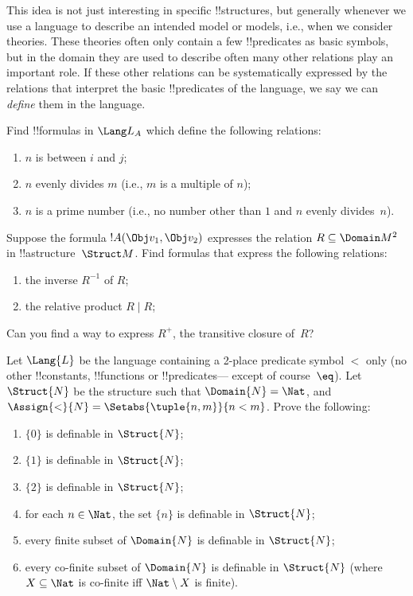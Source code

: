 \documentclass[../../../include/open-logic-section]{subfiles}
\begin{document}
\begin{explain}
This idea is not just interesting in specific !!{structure}s, but
generally whenever we use a language to describe an intended model or
models, i.e., when we consider theories.  These theories often only
contain a few !!{predicate}s as basic symbols, but in the domain they
are used to describe often many other relations play an important
role.  If these other relations can be systematically expressed by the
relations that interpret the basic !!{predicate}s of the language, we
say we can \emph{define} them in the language.
\end{explain}

\begin{prob}
Find !!{formula}s in $\Lang L_A$ which define the following relations:
\begin{enumerate}
\item $n$ is between $i$ and $j$;
\item $n$ evenly divides $m$ (i.e., $m$ is a multiple of $n$);
\item $n$ is a prime number (i.e., no number other than $1$ and $n$ evenly
  divides~$n$).
\end{enumerate}
\end{prob}

\begin{prob}
Suppose the formula $!A(\Obj v_1, \Obj v_2)$ expresses the relation $R
\subseteq \Domain M^2$ in !!a{structure}~$\Struct M$.  Find formulas
that express the following relations:
\begin{enumerate}
\item the inverse $R^{-1}$ of $R$;
\item the relative product $R \mid R$;
\end{enumerate}
Can you find a way to express $R^+$, the transitive closure of~$R$?
\end{prob}

\begin{prob}
Let $\Lang{L}$ be the language containing a 2-place predicate symbol
$<$ only (no other !!{constant}s, !!{function}s or !!{predicate}s---
except of course~$\eq$). Let $\Struct{N}$ be the structure such that
$\Domain{N} = \Nat$, and $\Assign{<}{N} = \Setabs{\tuple{n,m}}{n <
  m}$. Prove the following:
\begin{enumerate}
\item $\{ 0 \}$ is definable in $\Struct{N}$;
\item $\{ 1 \}$ is definable in $\Struct{N}$;
\item $\{ 2 \}$ is definable in $\Struct{N}$;
\item for each $n \in \Nat$, the set $\{ n \}$ is definable in
  $\Struct{N}$;
\item every finite subset of $\Domain{N}$ is definable in
  $\Struct{N}$;
\item every co-finite subset of $\Domain{N}$ is definable in
  $\Struct{N}$ (where $X \subseteq \Nat$ is co-finite iff
  $\Nat \setminus X$ is finite).
\end{enumerate}
\end{prob}
\end{document}
